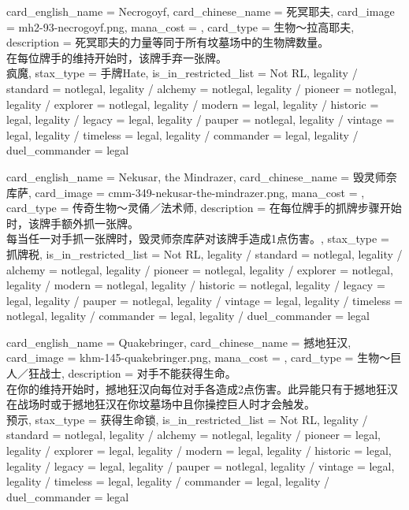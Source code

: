 \documentclass[lang = cn, color = black, 10pt]{AllThatStax}
\begin{document}
\card
{
	card_english_name = {Necrogoyf},
	card_chinese_name = {死冥耶夫},
	card_image = mh2-93-necrogoyf.png,
	mana_cost = ,
	card_type = 生物～拉高耶夫,
	description = {死冥耶夫的力量等同于所有坟墓场中的生物牌数量。\\
在每位牌手的维持开始时，该牌手弃一张牌。\\
疯魔},
	stax_type = 手牌Hate,
	is_in_restricted_list = Not RL,
	legality / standard = notlegal,
	legality / alchemy = notlegal,
	legality / pioneer = notlegal,
	legality / explorer = notlegal,
	legality / modern = legal,
	legality / historic = legal,
	legality / legacy = legal,
	legality / pauper = notlegal,
	legality / vintage = legal,
	legality / timeless = legal,
	legality / commander = legal,
	legality / duel_commander = legal
}

\card
{
	card_english_name = {Nekusar, the Mindrazer},
	card_chinese_name = {毁灵师奈库萨},
	card_image = cmm-349-nekusar-the-mindrazer.png,
	mana_cost = ,
	card_type = 传奇生物～灵俑／法术师,
	description = {在每位牌手的抓牌步骤开始时，该牌手额外抓一张牌。\\
每当任一对手抓一张牌时，毁灵师奈库萨对该牌手造成1点伤害。},
	stax_type = 抓牌税,
	is_in_restricted_list = Not RL,
	legality / standard = notlegal,
	legality / alchemy = notlegal,
	legality / pioneer = notlegal,
	legality / explorer = notlegal,
	legality / modern = notlegal,
	legality / historic = notlegal,
	legality / legacy = legal,
	legality / pauper = notlegal,
	legality / vintage = legal,
	legality / timeless = notlegal,
	legality / commander = legal,
	legality / duel_commander = legal
}

\card
{
	card_english_name = {Quakebringer},
	card_chinese_name = {撼地狂汉},
	card_image = khm-145-quakebringer.png,
	mana_cost = ,
	card_type = 生物～巨人／狂战士,
	description = {对手不能获得生命。\\
在你的维持开始时，撼地狂汉向每位对手各造成2点伤害。此异能只有于撼地狂汉在战场时或于撼地狂汉在你坟墓场中且你操控巨人时才会触发。\\
预示},
	stax_type = 获得生命锁,
	is_in_restricted_list = Not RL,
	legality / standard = notlegal,
	legality / alchemy = notlegal,
	legality / pioneer = legal,
	legality / explorer = legal,
	legality / modern = legal,
	legality / historic = legal,
	legality / legacy = legal,
	legality / pauper = notlegal,
	legality / vintage = legal,
	legality / timeless = legal,
	legality / commander = legal,
	legality / duel_commander = legal
}
\end{document}
